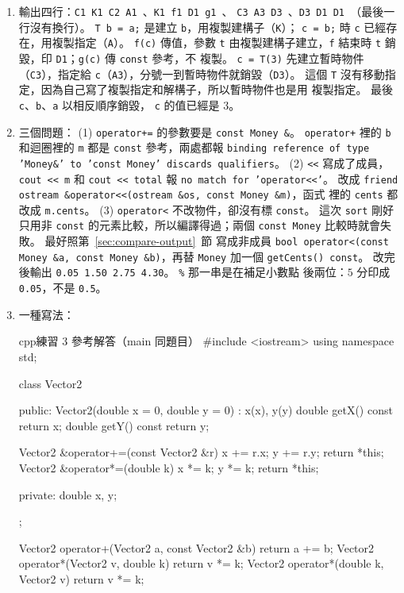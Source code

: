 \begin{enumerate}
\item 輸出四行：\texttt{C1 K1 C2 A1 }、\texttt{K1 f1 D1 g1 }、
\texttt{C3 A3 D3 }、\texttt{D3 D1 D1 }（最後一行沒有換行）。
\texttt{T b = a;} 是建立 \texttt{b}，用複製建構子（\texttt{K}）；
\texttt{c = b;} 時 \texttt{c} 已經存在，用複製指定（\texttt{A}）。
\texttt{f(c)} 傳值，參數 \texttt{t} 由複製建構子建立，\texttt{f} 結束時
\texttt{t} 銷毀，印 \texttt{D1}；\texttt{g(c)} 傳 \texttt{const} 參考，不
複製。 \texttt{c = T(3)} 先建立暫時物件（\texttt{C3}），指定給
\texttt{c}（\texttt{A3}），分號一到暫時物件就銷毀（\texttt{D3}）。 這個
\texttt{T} 沒有移動指定，因為自己寫了複製指定和解構子，所以暫時物件也是用
複製指定。 最後 \texttt{c}、\texttt{b}、\texttt{a} 以相反順序銷毀，
\texttt{c} 的值已經是 $3$。
\item 三個問題：
(1) \texttt{operator+=} 的參數要是 \texttt{const Money \&}。
\texttt{operator+} 裡的 \texttt{b} 和迴圈裡的 \texttt{m} 都是
\texttt{const} 參考，兩處都報 \texttt{binding reference of type
'Money\&' to 'const Money' discards qualifiers}。
(2) \texttt{<<} 寫成了成員，\texttt{cout << m} 和 \texttt{cout << total}
報 \texttt{no match for 'operator<<'}。 改成
\texttt{friend ostream \&operator<<(ostream \&os, const Money \&m)}，函式
裡的 \texttt{cents} 都改成 \texttt{m.cents}。
(3) \texttt{operator<} 不改物件，卻沒有標 \texttt{const}。 這次
\texttt{sort} 剛好只用非 \texttt{const} 的元素比較，所以編譯得過；兩個
\texttt{const Money} 比較時就會失敗。 最好照第~\ref{sec:compare-output}~節
寫成非成員 \texttt{bool operator<(const Money \&a, const Money \&b)}，再替
\texttt{Money} 加一個 \texttt{getCents() const}。
改完後輸出 \texttt{0.05 1.50 2.75 4.30}。 \texttt{\%} 那一串是在補足小數點
後兩位：$5$ 分印成 \texttt{0.05}，不是 \texttt{0.5}。
\item 一種寫法：
\begin{code}{cpp}{練習 3 參考解答（main 同題目）}
#include <iostream>
using namespace std;

class Vector2 {
public:
    Vector2(double x = 0, double y = 0) : x(x), y(y) {}
    double getX() const { return x; }
    double getY() const { return y; }

    Vector2 &operator+=(const Vector2 &r) {
        x += r.x;
        y += r.y;
        return *this;
    }
    Vector2 &operator*=(double k) {
        x *= k;
        y *= k;
        return *this;
    }

private:
    double x, y;
};

Vector2 operator+(Vector2 a, const Vector2 &b) { return a += b; }
Vector2 operator*(Vector2 v, double k) { return v *= k; }
Vector2 operator*(double k, Vector2 v) { return v *= k; }


\end{code}
\end{enumerate}
